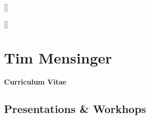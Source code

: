 \documentclass[11pt]{article}
\begin{document}
\newpage
\pagestyle{fancy}
\titlespacing*{\section}{0pt}{0pt}{0pt}
\titlespacing*{\subsection}{0pt}{0pt}{0pt}
\titleformat{\section}{\normalfont\Large\bfseries}{\thesection}{1em}{}[{\titlerule[0.8pt]}]
\titleformat{\subsection}{\normalfont\bfseries}{\thesection}{1em}{}[{\titlerule[0.4pt]}]


\section*{\hfill \LARGE Tim Mensinger}\vspace*{3pt}
\hfill\textbf{\large Curriculum Vitae}
\vspace{25pt}


\subsection*{Presentations \& Workhops}
\end{document}
